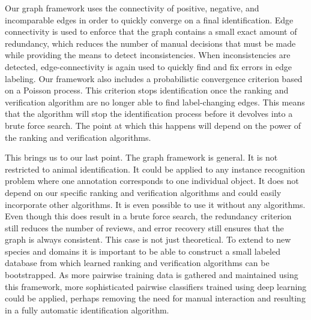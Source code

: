 

Our graph framework uses the connectivity of positive, negative, and incomparable edges in order to quickly
  converge on a final identification.
Edge connectivity is used to enforce that the graph contains a small exact amount of redundancy, which reduces
  the number of manual decisions that must be made while providing the means to detect inconsistencies.
When inconsistencies are detected, edge-connectivity is again used to quickly find and fix errors in edge
  labeling.
Our framework also includes a probabilistic convergence criterion based on a Poisson process.
This criterion stops identification once the ranking and verification algorithm are no longer able to find
  label-changing edges.
This means that the algorithm will stop the identification process before it devolves into a brute force search.
The point at which this happens will depend on the power of the ranking and verification algorithms.

This brings us to our last point.
The graph framework is general.
It is not restricted to animal identification.
It could be applied to any instance recognition problem where one annotation corresponds to one individual
  object.
It does not depend on our specific ranking and verification algorithms and could easily incorporate other
  algorithms.
It is even possible to use it without any algorithms.
Even though this does result in a brute force search, the redundancy criterion still reduces the number of
  reviews, and error recovery still ensures that the graph is always consistent.
This case is not just theoretical.
To extend to new species and domains it is important to be able to construct a small labeled database from which
  learned ranking and verification algorithms can be bootstrapped.
As more pairwise training data is gathered and maintained using this framework, more sophisticated pairwise
  classifiers trained using deep learning could be applied, perhaps removing the need for manual interaction and
  resulting in a fully automatic identification algorithm.

